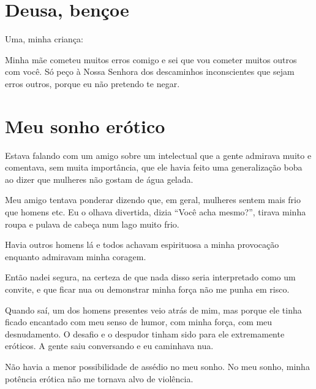 \chapter{Deusa, bençoe}

Uma, minha criança:

Minha mãe cometeu muitos erros comigo e sei que vou cometer muitos
outros com você. Só peço à Nossa Senhora dos descaminhos inconscientes
que sejam erros outros, porque eu não pretendo te negar.

\chapter{Meu sonho erótico}

Estava falando com um amigo sobre um intelectual que a gente admirava
muito e comentava, sem muita importância, que ele havia feito uma
generalização boba ao dizer que mulheres não gostam de água gelada.

Meu amigo tentava ponderar dizendo que, em geral, mulheres sentem mais
frio que homens etc. Eu o olhava divertida, dizia ``Você acha mesmo?'',
tirava minha roupa e pulava de cabeça num lago muito frio.

Havia outros homens lá e todos achavam espirituosa a minha provocação
enquanto admiravam minha coragem.

Então nadei segura, na certeza de que nada disso seria interpretado como
um convite, e que ficar nua ou demonstrar minha força não me punha em
risco.

Quando saí, um dos homens presentes veio atrás de mim, mas porque ele
tinha ficado encantado com meu senso de humor, com minha força, com meu
desnudamento. O desafio e o despudor tinham sido para ele extremamente
eróticos. A gente saiu conversando e eu caminhava nua.

Não havia a menor possibilidade de assédio no meu sonho. No meu sonho,
minha potência erótica não me tornava alvo de violência.
